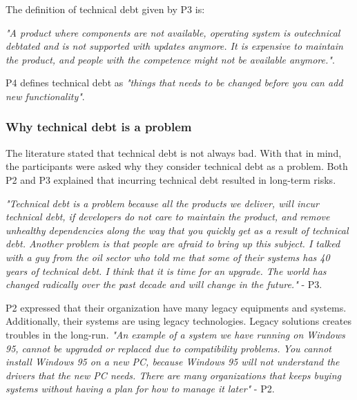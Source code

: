 The definition of technical debt given by P3 is:
\begin{displayquote}
\textit{"A product where components are not available, operating system is outechnical debtated and is not supported with updates anymore. It is expensive to maintain the product, and people with the competence might not be available anymore."}.
\end{displayquote}

P4 defines technical debt as \textit{"things that needs to be changed before you can add new functionality"}.

\subsubsection{Why technical debt is a problem}
The literature stated that technical debt is not always bad\cite{p31-guo}. With that in mind, the participants were asked why they consider technical debt as a problem. Both P2 and P3 explained that incurring technical debt resulted in long-term risks. 

\begin{displayquote}
	\textit{"Technical debt is a problem because all the products we deliver, will incur technical debt, if developers do not care to maintain the product, and remove unhealthy dependencies along the way that you quickly get as a result of technical debt. Another problem is that people are afraid to bring up this subject. I talked with a guy from the oil sector who told me that some of their systems has 40 years of technical debt. I think that it is time for an upgrade. The world has changed radically over the past decade and will change in the future."} - P3.
\end{displayquote}

P2 expressed that their organization have many legacy equipments and systems. Additionally, their systems are using legacy technologies. Legacy solutions creates troubles in the long-run. \textit{"An example of a system we have running on Windows 95, cannot be upgraded or replaced due to compatibility problems. You cannot install Windows 95 on a new PC, because Windows 95 will not understand the drivers that the new PC needs. There are many organizations that keeps buying systems without having a plan for how to manage it later"} - P2. 


